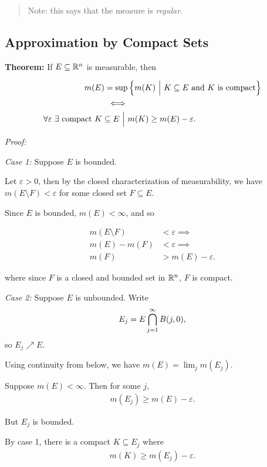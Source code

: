 \begin{quote}
Note: this says that the measure is \emph{regular}.
\end{quote}

\hypertarget{approximation-by-compact-sets}{%
\subsection{Approximation by Compact
Sets}\label{approximation-by-compact-sets}}

\textbf{Theorem:} If \(E\subseteq {\mathbb{R}}^n\) is measurable, then

\begin{align*}
m(E) = \sup&\left\{{m(K) {~\mathrel{\Big|}~} K\subseteq E~\text{and $K$ is compact}}\right\} \\
\iff & \\
\forall \varepsilon ~\exists ~\text{compact}~ K\subseteq E  {~\mathrel{\Big|}~}& m(K) \geq m(E) - \varepsilon
.\end{align*}

\emph{Proof:}

\emph{Case 1:} Suppose \(E\) is bounded.

Let \(\varepsilon > 0\), then by the closed characterization of
measurability, we have \(m(E\setminus F) < \varepsilon\) for some closed
set \(F\subseteq E\).

Since \(E\) is bounded, \(m(E) < \infty\), and so

\begin{align*}
m(E\setminus F) &< \varepsilon  \implies \\
m(E) - m(F) &< \varepsilon \implies \\
m(F) &> m(E) - \varepsilon
.\end{align*}

where since \(F\) is a closed and bounded set in \({\mathbb{R}}^n\), \(F\) is
compact.

\emph{Case 2:} Suppose \(E\) is unbounded. Write
\begin{align*}
E_j = E \bigcap_{j=1}^\infty B(j, 0)
,\end{align*} so \(E_j \nearrow E\).

Using continuity from below, we have \(m(E) = \lim_j m(E_j)\).

Suppose \(m(E) < \infty\). Then for some \(j\),
\begin{align*}
m(E_j) \geq m(E) - \varepsilon
.\end{align*}

But \(E_j\) is bounded.

By case 1, there is a compact \(K \subseteq E_j\) where
\begin{align*}
m(K) \geq m(E_j) - \varepsilon
.\end{align*}

